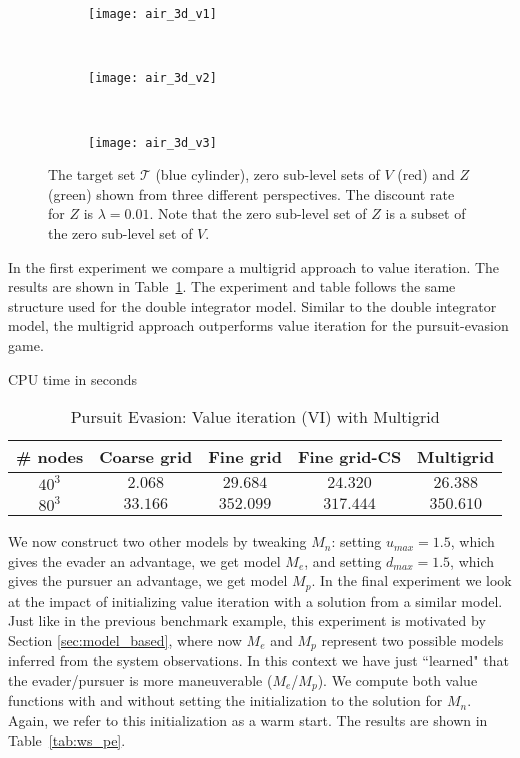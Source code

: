 \begin{figure*}[h]
    \centering
    \begin{subfigure}[t]{0.3\textwidth}
        \centering
        \texttt{[image: air\_3d\_v1]}
    \end{subfigure}%
    ~ 
    \begin{subfigure}[t]{0.3\textwidth}
        \centering
        \texttt{[image: air\_3d\_v2]}
    \end{subfigure}
    ~
    \begin{subfigure}[t]{0.3\textwidth}
        \centering
        \texttt{[image: air\_3d\_v3]}
    \end{subfigure}%
    \caption{The target set $\mathcal{T}$ (blue cylinder), zero sub-level sets of $V$ (red) and $Z$ (green) shown from three different perspectives. The discount rate for $Z$ is $\lambda=0.01$. Note that the zero sub-level set of $Z$ is a subset of the zero sub-level set of $V$.}
    \label{fig:air3D}
\end{figure*}

In the first experiment we compare a multigrid approach to value iteration.  The results are shown in Table~\ref{tab:multigrid_pe}. The experiment and table follows the same structure used for the double integrator model. Similar to the double integrator model, the multigrid approach outperforms value iteration for the pursuit-evasion game.

\begin{table}
\centering
\caption{Pursuit Evasion: Value iteration (VI) with Multigrid} CPU time in seconds
\begin{tabular}{|c| c| c| c| c| }
\hline
\# nodes & Coarse grid & Fine grid &  Fine grid-CS & Multigrid \\ \hline
$40^3$ & $2.068$ & $29.684$ & $24.320$ & $26.388$ \\ \hline
$80^3$ & $33.166$ & $352.099$ & $317.444$ & $350.610$\\ \hline
\end{tabular}
\label{tab:multigrid_pe}
\end{table}

We now construct two other models by tweaking $M_n$: setting $u_{max}=1.5$, which gives the evader an advantage, we get model $M_e$, and setting $d_{max}=1.5$, which gives the pursuer an advantage,  we get model $M_p$. In the final experiment we look at the impact of initializing value iteration with a solution from a similar model. Just like in the previous benchmark example, this experiment is motivated by Section \ref{sec:model_based}, where now $M_e$ and $M_p$ represent two possible models inferred from the system observations. In this context we have just ``learned" that the evader/pursuer is more maneuverable ($M_e$/$M_p$). We compute both value functions with and without setting the initialization to the solution for $M_n$. Again, we refer to this initialization as a warm start. The results are shown in Table~\ref{tab:ws_pe}.

